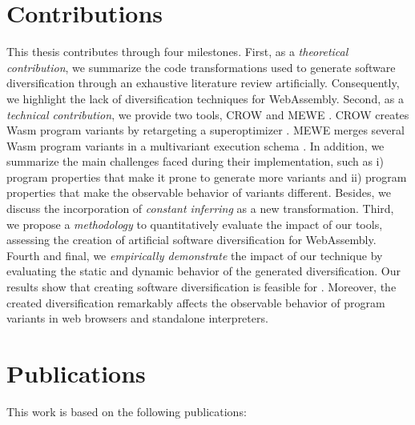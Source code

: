 \renewcommand{\rqone}{$RQ_1$. To what extent can we artifically generate program variants for WebAssembly?}

\renewcommand{\rqtwo}{$RQ_2$. To what extent are the generated variants dynamically different?}
\renewcommand{\rqthree}{$RQ_3$. To what extent do the artificial variants exhibit different execution times on edge-cloud platforms?}

\section{Contributions}

This thesis contributes through four milestones. First, as a \emph{theoretical contribution}, we summarize the code transformations used to generate software diversification through an exhaustive literature review artificially. Consequently, we highlight the lack of diversification techniques for WebAssembly.
Second, as a \emph{technical contribution}, we provide two tools, CROW \cite{CROW} and MEWE \cite{MEWE}. CROW creates 
Wasm program variants by retargeting a superoptimizer \cite{Sasnauskas2017Souper:Superoptimizer}.
MEWE merges several Wasm program variants in a multivariant execution schema \cite{okhravi2013survey}.
In addition, we summarize the main challenges faced during their implementation, such as i) program properties that make it prone to generate more variants and ii) program properties that make the observable behavior of variants different. 
Besides, we discuss the incorporation of \emph{constant inferring} as a new transformation. 
Third, we propose a \emph{methodology} to quantitatively evaluate the impact of our tools, assessing the creation of artificial software diversification for WebAssembly. 
Fourth and final, we \emph{empirically demonstrate} the impact of our technique by evaluating the static and dynamic behavior of the generated diversification.
Our results show that creating software diversification is feasible for \wasm. 
Moreover, the created diversification remarkably affects the observable behavior of program variants in web browsers and standalone interpreters.

\section{Publications}

This work is based on the following publications:

